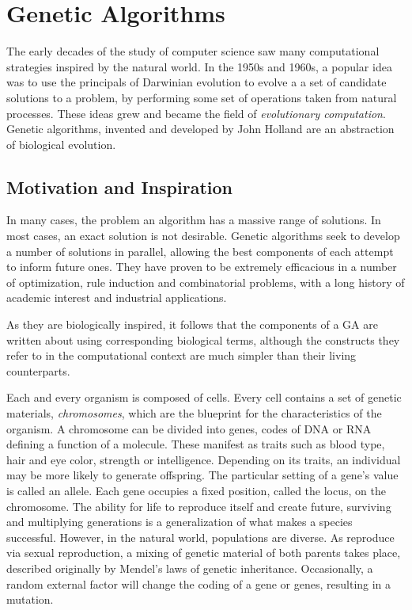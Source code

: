 \section{Genetic Algorithms}
The early decades of the study of computer science saw many computational strategies inspired by the natural world. In the 1950s and 1960s, a popular idea was to use the principals of Darwinian evolution to evolve a a set of candidate solutions to a problem, by performing some set of operations taken from natural processes. These ideas grew and became the field of \textit{evolutionary computation}. Genetic algorithms, invented and developed by John Holland \cite{holland1975adaptation} are an abstraction of biological evolution.

\cite{Ding2007}

\subsection{Motivation and Inspiration}
In many cases, the problem an algorithm has a massive range of solutions. In most cases, an exact solution is not desirable. Genetic algorithms seek to develop a number of solutions in parallel, allowing the best components of each attempt to inform future ones. They have proven to be extremely efficacious in a number of optimization, rule induction and combinatorial problems, with a long history of academic interest and industrial applications. 

As they are biologically inspired, it follows that the components of a GA are written about using corresponding biological terms, although the constructs they refer to in the computational context are much simpler than their living counterparts.

Each and every organism is composed of cells. Every cell contains a set of genetic materials, \textit{chromosomes}, which are the blueprint for the characteristics of the organism. A chromosome can be divided into genes, codes of DNA or RNA defining a function of a molecule. These manifest as traits such as blood type, hair and eye color, strength or intelligence. Depending on its traits, an individual may be more likely to generate offspring. The particular setting of a gene's value is called an allele. Each gene occupies a fixed position, called the locus, on the chromosome. The ability for life to reproduce itself and create future, surviving and multiplying generations is a generalization of what makes a species successful. However, in the natural world, populations are diverse. As reproduce via sexual reproduction, a mixing of genetic material of both parents takes place, described originally by Mendel's laws of genetic inheritance. Occasionally, a random external factor will change the coding of a gene or genes, resulting in a mutation.

